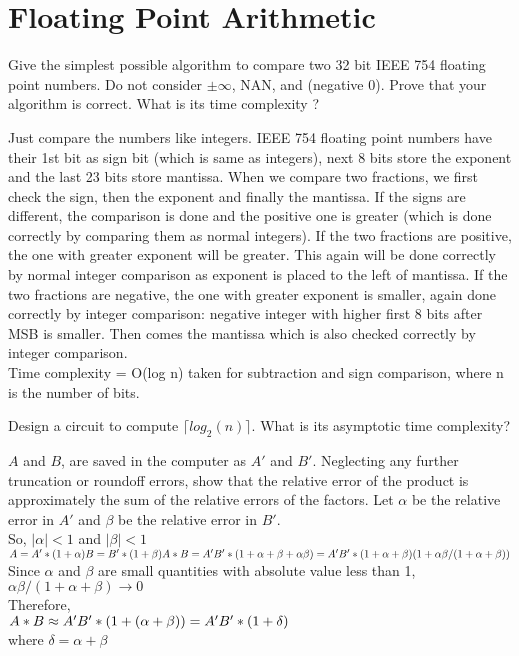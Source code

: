 \section*{Floating Point Arithmetic}

\begin{ExerciseList}

\Exercise
Give the simplest possible algorithm to compare two 32 bit IEEE 754 floating point numbers. Do not consider $\pm
\infty$, NAN, and (negative 0).  Prove that your algorithm is correct. What is its time complexity ?

\Answer
Just compare the numbers like integers. IEEE 754 floating point numbers have their 1st bit as sign bit (which is same as
integers), next 8 bits store the exponent and the last 23 bits store mantissa. When we compare two fractions, we first
check the sign, then the exponent and finally the mantissa. If the signs are different, the comparison is done and the
positive one is greater (which is done correctly by comparing them as normal integers). If the two fractions are
positive, the one with greater exponent will be greater. This again will be done correctly by normal integer comparison
as exponent is placed to the left of mantissa. If the two fractions are negative, the one with greater exponent is
smaller, again done correctly by integer comparison: negative integer with higher first 8 bits after MSB is smaller.
Then comes the mantissa which is also checked correctly by integer comparison. \\ Time complexity = O(log n) taken for
subtraction and sign comparison, where n is the number of bits.



\Exercise 
Design a circuit to compute $\lceil log_2(n) \rceil$. What is its asymptotic time complexity?

\Exercise $A$ and $B$, are saved in the computer as $A'$ and $B'$. Neglecting any further truncation or roundoff errors, show that the relative error of the product is approximately the sum of the relative errors of the factors.  \Answer Let $\alpha$ be the relative error in $A'$ and $\beta$ be the relative error in $B'$. \\ So, $|\alpha| < 1$ and $|\beta| < 1$ \\ $A=A' * (1+\alpha) \\ B=B' * (1+\beta) \\ A*B = A'B' * ( 1+ \alpha + \beta + \alpha\beta) \\ = A'B' * (1+\alpha+\beta)(1+\alpha\beta/(1+\alpha+\beta)) \\ $
Since $\alpha$ and $\beta$ are small quantities with absolute value less than 1, $\alpha\beta / (1+\alpha+\beta) \longrightarrow 0$\\
Therefore, \\
$A*B \approx A'B' * (1+ (\alpha+\beta))\\
		= A'B' *(1+\delta) $\\
where $\delta = \alpha + \beta$


\end{ExerciseList}
